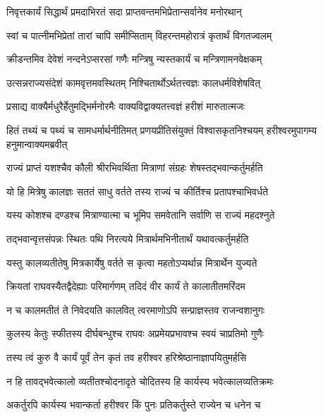 \twolineshloka
{निवृत्तकार्यं सिद्धार्थं प्रमदाभिरतं सदा}
{प्राप्तवन्तमभिप्रेतान्सर्वानेव मनोरथान्} %

\twolineshloka
{स्वां च पात्नीमभिप्रेतां तारां चापि समीप्सिताम्}
{विहरन्तमहोरात्रं कृतार्थं विगतज्वलम्} %

\twolineshloka
{क्रीडन्तमिव देवेशं नन्दनेऽप्सरसां गणैः}
{मन्त्रिषु न्यस्तकार्यं च मन्त्रिणामनवेक्षकम्} %

\twolineshloka
{उत्सन्नराज्यसंदेशं कामवृत्तमवस्थितम्}
{निश्चितार्थोऽर्थतत्त्वज्ञः कालधर्मविशेषवित्} %

\twolineshloka
{प्रसाद्य वाक्यैर्मधुरैर्हेतुमद्भिर्मनोरमैः}
{वाक्यविद्वाक्यतत्त्वज्ञं हरीशं मारुतात्मजः} %

\threelineshloka
{हितं तथ्यं च पथ्यं च सामधर्मार्थनीतिमत्}
{प्रणयप्रीतिसंयुक्तं विश्वासकृतनिश्चयम्}
{हरीश्वरमुपागम्य हनुमान्वाक्यमब्रवीत्} %

\twolineshloka
{राज्यं प्राप्तं यशश्चैव कौली श्रीरभिवर्थिता}
{मित्राणां संग्रहः शेषस्तद्भवान्कर्तुमर्हति} %

\twolineshloka
{यो हि मित्रेषु कालज्ञः सततं साधु वर्तते}
{तस्य राज्यं च कीर्तिश्च प्रतापश्चाभिवर्धते} %

\twolineshloka
{यस्य कोशश्च दण्डश्च मित्राण्यात्मा च भूमिप}
{समवेतानि सर्वाणि स राज्यं महदश्नुते} %

\twolineshloka
{तद्भवान्वृत्तसंपन्नः स्थितः पथि निरत्यये}
{मित्रार्थमभिनीतार्थं यथावत्कर्तुमर्हति} %

\twolineshloka
{यस्तु कालव्यतीतेषु मित्रकार्येषु वर्तते}
{स कृत्वा महतोऽप्यर्थान्न मित्रार्थेन युज्यते} %

\twolineshloka
{क्रियतां राघवस्यैतद्वैदेह्याः परिमार्गणम्}
{तदिदं वीर कार्यं ते कालातीतमरिंदम} %

\twolineshloka
{न च कालमतीतं ते निवेदयति कालवित्}
{त्वरमाणोऽपि सन्प्राज्ञस्तव राजन्वशानुगः} %

\twolineshloka
{कुलस्य केतुः स्फीतस्य दीर्घबन्धुश्च राघवः}
{अप्रमेयप्रभावश्च स्वयं चाप्रतिमो गुणैः} %

\twolineshloka
{तस्य त्वं कुरु वै कार्यं पूर्वं तेन कृतं तव}
{हरीश्वर हरिश्रेष्ठानाज्ञापयितुमर्हसि} %

\twolineshloka
{न हि तावद्भवेत्कालो व्यतीतश्चोदनादृते}
{चोदितस्य हि कार्यस्य भवेत्कालव्यतिक्रमः} %

\twolineshloka
{अकर्तुरपि कार्यस्य भवान्कर्ता हरीश्वर}
{किं पुनः प्रतिकर्तुस्ते राज्येन च धनेन च} %

